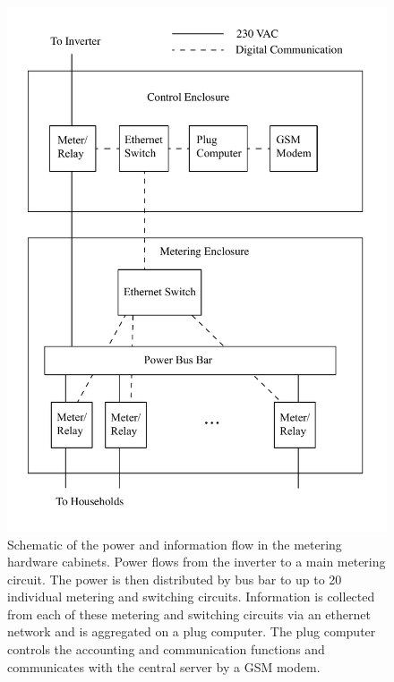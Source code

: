 \documentclass[conference]{IEEEtran}
\begin{document}
\begin{figure}[]
\begin{center}
\includegraphics[width=\columnwidth]{figures/Enclosure.pdf}
\end{center}
\caption{Schematic of the power and information flow in the metering hardware cabinets.
Power flows from the inverter to a main metering circuit.  The power is then distributed
by bus bar to up to 20 individual metering and switching circuits.  Information is collected
from each of these metering and switching circuits via an ethernet network and is aggregated
on a plug computer.  The plug computer controls the accounting and communication functions
and communicates with the central server by a GSM modem.}
\label{Enclosure}
\end{figure}
\end{document}
